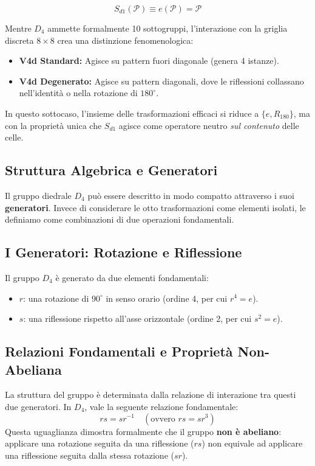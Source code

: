 \begin{equation}
    S_{d1}(\mathcal{P}) \equiv e(\mathcal{P}) = \mathcal{P}
\end{equation}

Mentre $D_4$ ammette formalmente 10 sottogruppi, l'interazione con la griglia discreta $8 \times 8$ crea una distinzione fenomenologica:
\begin{itemize}
    \item \textbf{V4d Standard:} Agisce su pattern fuori diagonale (genera 4 istanze).
    \item \textbf{V4d Degenerato:} Agisce su pattern diagonali, dove le riflessioni collassano nell'identità o nella rotazione di $180^\circ$.
\end{itemize}
In questo sottocaso, l'insieme delle trasformazioni efficaci si riduce a $\{e, R_{180}\}$, ma con la proprietà unica che $S_{d1}$ agisce come operatore neutro \textit{sul contenuto} delle celle.


\subsection{Struttura Algebrica e Generatori}

Il gruppo diedrale $D_4$ può essere descritto in modo compatto attraverso i suoi \textbf{generatori}. Invece di considerare le otto trasformazioni come elementi isolati, le definiamo come combinazioni di due operazioni fondamentali.

\subsection{I Generatori: Rotazione e Riflessione}
Il gruppo $D_4$ è generato da due elementi fondamentali:
\begin{itemize}
    \item $r$: una rotazione di $90^\circ$ in senso orario (ordine 4, per cui $r^4 = e$).
    \item $s$: una riflessione rispetto all'asse orizzontale (ordine 2, per cui $s^2 = e$).
\end{itemize}

\subsection{Relazioni Fondamentali e Proprietà Non-Abeliana}
La struttura del gruppo è determinata dalla relazione di interazione tra questi due generatori. In $D_4$, vale la seguente relazione fondamentale:
\begin{equation}
    rs = sr^{-1} \quad (\text{ovvero } rs = sr^3)
\end{equation}
Questa uguaglianza dimostra formalmente che il gruppo \textbf{non è abeliano}: applicare una rotazione seguita da una riflessione ($rs$) non equivale ad applicare una riflessione seguita dalla stessa rotazione ($sr$). 

